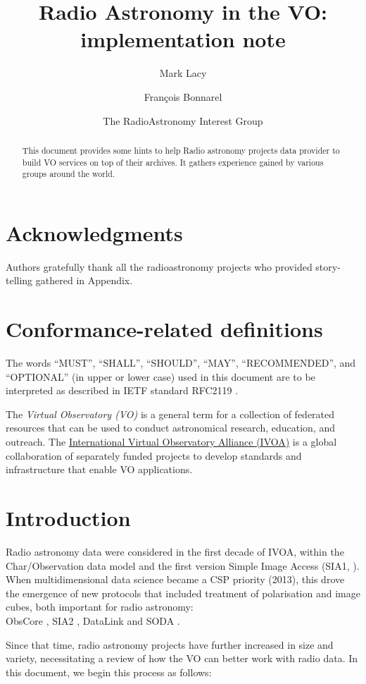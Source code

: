\documentclass[11pt,a4paper]{ivoa}
\title{Radio Astronomy in the VO:\\ implementation note}
\author[https://wiki.ivoa.net/twiki/bin/view/IVOA/MarkLacy]{Mark Lacy}
\author[https://wiki.ivoa.net/twiki/bin/view/IVOA/FrancoisBonnarel]{Fran\c cois Bonnarel}
\author{The RadioAstronomy Interest Group}
\begin{document}
\begin{abstract}
	This document provides some hints to help Radio astronomy projects data provider to build VO
	services on top of their archives. It gathers experience gained by various groups around the world.
\end{abstract}


\section*{Acknowledgments}

Authors gratefully thank all the radioastronomy projects who provided story-telling gathered in 
Appendix.

\section*{Conformance-related definitions}

The words ``MUST'', ``SHALL'', ``SHOULD'', ``MAY'', ``RECOMMENDED'', and
``OPTIONAL'' (in upper or lower case) used in this document are to be
interpreted as described in IETF standard RFC2119 \citep{std:RFC2119}.

The \emph{Virtual Observatory (VO)} is a
general term for a collection of federated resources that can be used
to conduct astronomical research, education, and outreach.
The \href{https://www.ivoa.net}{International
Virtual Observatory Alliance (IVOA)} is a global
collaboration of separately funded projects to develop standards and
infrastructure that enable VO applications.


\section{Introduction}

Radio astronomy data were considered in the first decade of IVOA, within the Char/Observation data 
model and the first version Simple Image Access (SIA1, \cite{std:SIAP}). When multidimensional data 
science became a CSP priority (2013), this drove the emergence of new protocols that included 
treatment of polarisation and image cubes, both important for radio astronomy:\\ ObsCore
\citep{std:OBSCORE}, SIA2 \citep{std:SIAV2} , DataLink \citep{2015ivoa.spec.0617D} and SODA
\citep{std:SODA}. 

Since that time, radio astronomy projects have further increased in size and variety, necessitating 
a review of how the VO can better work with radio data. In this document, we begin this process as 
follows:
\end{document}

